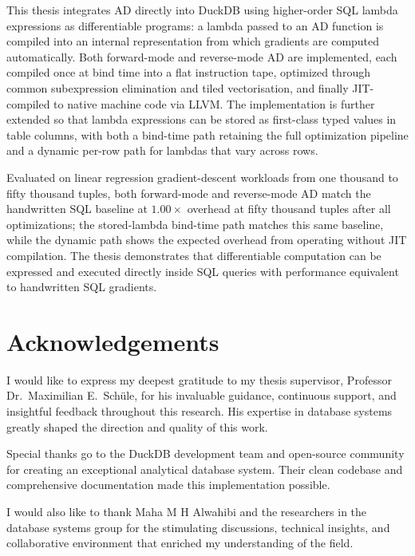\documentclass[12pt]{report}
\begin{document}
This thesis integrates AD directly into DuckDB using higher-order SQL
lambda expressions as differentiable programs: a lambda passed to an AD
function is compiled into an internal representation from which gradients
are computed automatically. Both forward-mode and reverse-mode AD are
implemented, each compiled once at bind time into a flat instruction tape,
optimized through common subexpression elimination and tiled vectorisation,
and finally JIT-compiled to native machine code via LLVM. The implementation
is further extended so that lambda expressions can be stored as first-class
typed values in table columns, with both a bind-time path retaining the
full optimization pipeline and a dynamic per-row path for lambdas that vary
across rows.

Evaluated on linear regression gradient-descent workloads from one thousand
to fifty thousand tuples, both forward-mode and reverse-mode AD match the
handwritten SQL baseline at $1.00\times$ overhead at fifty thousand tuples
after all optimizations; the stored-lambda bind-time path matches this same
baseline, while the dynamic path shows the expected overhead from operating
without JIT compilation. The thesis demonstrates that differentiable
computation can be expressed and executed directly inside SQL queries with
performance equivalent to handwritten SQL gradients.


\newpage


\chapter*{Acknowledgements}

I would like to express my deepest gratitude to my thesis supervisor, Professor Dr.\ Maximilian E.\ Sch\"ule, for his invaluable guidance, continuous support, and insightful feedback throughout this research. His expertise in database systems greatly shaped the direction and quality of this work.

Special thanks go to the DuckDB development team and open-source community for creating an exceptional analytical database system. Their clean codebase and comprehensive documentation made this implementation possible.

I would also like to thank Maha M H Alwahibi and the researchers in the database systems group for the stimulating discussions, technical insights, and collaborative environment that enriched my understanding of the field.
\end{document}
